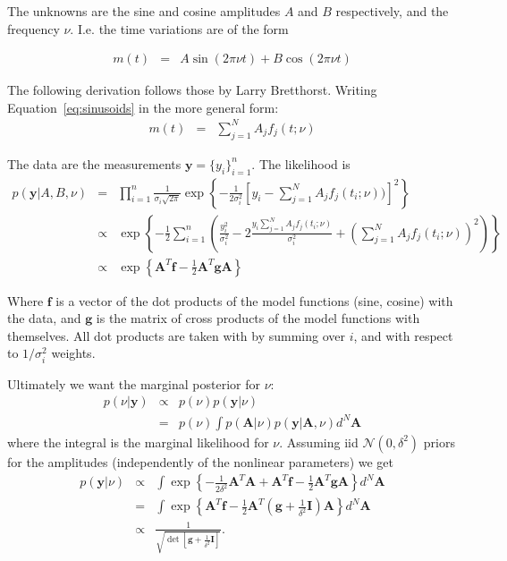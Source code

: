 \documentclass[a4paper, 10pt]{article}
\title{}
\author{Me}
\date{\today}
\begin{document}
\maketitle


The unknowns are the sine and cosine amplitudes $A$ and $B$ respectively,
and the frequency $\nu$. I.e. the time variations are of the form

\begin{eqnarray}
m(t) &=& A\sin(2\pi\nu t) + B\cos(2\pi\nu t)\label{eq:sinusoids}
\end{eqnarray}

The following derivation follows those by Larry Bretthorst. Writing
Equation~\ref{eq:sinusoids} in the more general form:
\begin{eqnarray}
m(t) &=& \sum_{j=1}^N A_j f_j(t; \nu)\label{eq:sinusoids}
\end{eqnarray}

The data are the measurements
$\mathbf{y} = \{y_i\}_{i=1}^n$.
The likelihood is
\begin{eqnarray}
p(\mathbf{y} | A, B, \nu)
&=&
\prod_{i=1}^{n} \frac{1}{\sigma_i \sqrt{2\pi}}
\exp\left\{
-\frac{1}{2\sigma_i^2}
\left[y_i - \sum_{j=1}^N A_j f_j(t_i; \nu))\right]^2
\right\}
\\
&\propto&
\exp\left\{
-\frac{1}{2}\sum_{i=1}^n
\left(
\frac{y_i^2}{\sigma_i^2} - 2\frac{y_i \sum_{j=1}^N A_j f_j(t_i; \nu)}{\sigma_i^2}
+ \left(\sum_{j=1}^N A_j f_j(t_i; \nu)\right)^2
\right)
\right\}\nonumber\\
&\propto&
\exp\left\{
\mathbf{A}^T\mathbf{f}
 -\frac{1}{2} \mathbf{A}^T\mathbf{g}\mathbf{A}
\right\}
\end{eqnarray}

Where $\mathbf{f}$ is a vector of the dot products of the model functions
(sine, cosine) with the data, and $\mathbf{g}$ is the matrix of cross products
of the model functions with themselves. All dot products are taken with
by summing over $i$, and with respect to $1/\sigma_i^2$ weights.

Ultimately we want the marginal posterior for $\nu$:
\begin{eqnarray}
p(\nu | \mathbf{y}) &\propto& p(\nu)p(\mathbf{y} | \nu)\\
&=& p(\nu)\int p(\mathbf{A}|\nu)p(\mathbf{y} | \mathbf{A}, \nu) d^N\mathbf{A}
\end{eqnarray}
where the integral is the marginal likelihood for $\nu$. Assuming
iid $\mathcal{N}(0, \delta^2)$ priors for the amplitudes (independently of
the nonlinear parameters) we get
\begin{eqnarray}
p(\mathbf{y} | \nu)
&\propto& \int\exp\left\{
 -\frac{1}{2\delta^2} \mathbf{A}^T\mathbf{A}
 +\mathbf{A}^T\mathbf{f}
 -\frac{1}{2} \mathbf{A}^T\mathbf{g}\mathbf{A}
\right\} d^N\mathbf{A}\nonumber\\
&=&
\int\exp\left\{
\mathbf{A}^T\mathbf{f}
 -\frac{1}{2} \mathbf{A}^T\left(\mathbf{g} + \frac{1}{\delta^2}\mathbf{I}\right)\mathbf{A}
\right\} d^N\mathbf{A}\nonumber\\
&\propto&
\frac{1}{\sqrt{\det\left[\mathbf{g} + \frac{1}{\delta^2}\mathbf{I}\right]}}.
\end{eqnarray}
\end{document}
